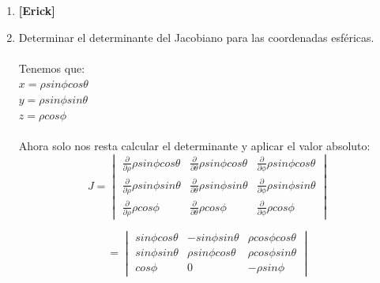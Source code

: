 \documentclass[10pt,letterpaper,fleqn]{article}
\begin{document}
\begin{enumerate}
        \item \textbf{[Erick]}

        \item Determinar el determinante del Jacobiano para las coordenadas esféricas.\\\\
        Tenemos que:\\
        $x = \rho sin\phi cos\theta$\\ 
        $y = \rho sin\phi sin\theta$\\ 
        $z = \rho cos\phi$\\\\
        Ahora solo nos resta calcular el determinante y aplicar el valor absoluto:\\
        \[
        J =
        \begin{vmatrix}
        \frac{\partial}{\partial \rho} \rho sin\phi cos\theta & 
        \frac{\partial}{\partial \theta} \rho sin\phi cos\theta & 
        \frac{\partial}{\partial \phi} \rho sin\phi cos\theta \\ 
        \frac{\partial}{\partial \rho} \rho sin\phi sin\theta & 
        \frac{\partial}{\partial \theta} \rho sin\phi sin\theta & 
        \frac{\partial}{\partial \phi} \rho sin\phi sin\theta \\
        \frac{\partial}{\partial \rho} \rho cos\phi & 
        \frac{\partial}{\partial \theta} \rho cos\phi & 
        \frac{\partial}{\partial \phi} \rho cos\phi
        \end{vmatrix}
        \] 

		\[        
        =
        \begin{vmatrix}
        sin\phi cos\theta & 
        - sin\phi sin\theta & 
        \rho cos\phi cos\theta \\ 
        sin\phi sin\theta & 
        \rho sin\phi cos\theta & 
        \rho cos\phi sin\theta \\
        cos\phi & 
        0 & 
        - \rho sin\phi
        \end{vmatrix}
        \] 
        

\end{enumerate}
\end{document}
